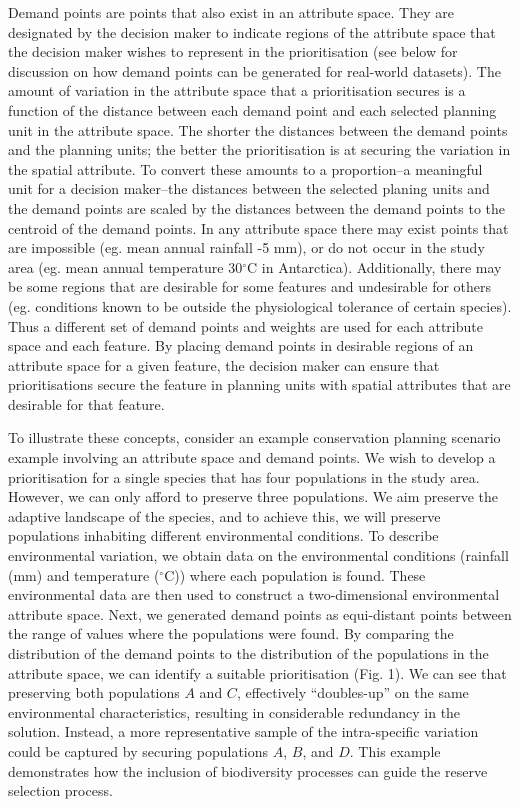 \documentclass[11pt,]{article}
\begin{document}
Demand points are points that also exist in an attribute space. They are
designated by the decision maker to indicate regions of the attribute
space that the decision maker wishes to represent in the prioritisation
(see below for discussion on how demand points can be generated for
real-world datasets). The amount of variation in the attribute space
that a prioritisation secures is a function of the distance between each
demand point and each selected planning unit in the attribute space. The
shorter the distances between the demand points and the planning units;
the better the prioritisation is at securing the variation in the
spatial attribute. To convert these amounts to a proportion--a
meaningful unit for a decision maker--the distances between the selected
planing units and the demand points are scaled by the distances between
the demand points to the centroid of the demand points. In any attribute
space there may exist points that are impossible (eg. mean annual
rainfall -5 mm), or do not occur in the study area (eg. mean annual
temperature 30$^{\circ}$C in Antarctica). Additionally, there may be
some regions that are desirable for some features and undesirable for
others (eg. conditions known to be outside the physiological tolerance
of certain species). Thus a different set of demand points and weights
are used for each attribute space and each feature. By placing demand
points in desirable regions of an attribute space for a given feature,
the decision maker can ensure that prioritisations secure the feature in
planning units with spatial attributes that are desirable for that
feature.

To illustrate these concepts, consider an example conservation planning
scenario example involving an attribute space and demand points. We wish
to develop a prioritisation for a single species that has four
populations in the study area. However, we can only afford to preserve
three populations. We aim preserve the adaptive landscape of the
species, and to achieve this, we will preserve populations inhabiting
different environmental conditions. To describe environmental variation,
we obtain data on the environmental conditions (rainfall (mm) and
temperature ($^{\circ}$C)) where each population is found. These
environmental data are then used to construct a two-dimensional
environmental attribute space. Next, we generated demand points as
equi-distant points between the range of values where the populations
were found. By comparing the distribution of the demand points to the
distribution of the populations in the attribute space, we can identify
a suitable prioritisation (Fig. 1). We can see that preserving both
populations $A$ and $C$, effectively ``doubles-up'' on the same
environmental characteristics, resulting in considerable redundancy in
the solution. Instead, a more representative sample of the
intra-specific variation could be captured by securing populations $A$,
$B$, and $D$. This example demonstrates how the inclusion of
biodiversity processes can guide the reserve selection process.
\end{document}
